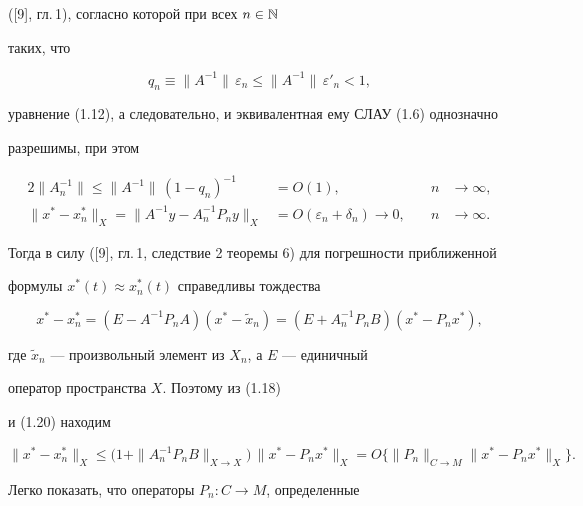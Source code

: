 ([9], гл.\,1), согласно которой при всех $n\in \Bbb N$


таких, что


\begin{equation}


q_n\equiv \|A^{-1}\|\, \varepsilon_n\leq \|A^{-1}\|\, \varepsilon'_n<1,


\end{equation}


уравнение (1.12), а следовательно, и эквивалентная ему СЛАУ (1.6) однозначно


разрешимы, при этом


\begin{alignat}{2}


\|A_n^{-1}\|\leq \|A^{-1}\|\, (1-q_n)^{-1}&=O(1),&\quad n&\to \infty ,\\


%


\|x^*-x_n^*\|_X=\|A^{-1}y-A_n^{-1}P_ny\|_X&=O(\varepsilon_n+\delta_n)


\rightarrow 0,&\quad n&\to \infty .


\end{alignat}


Тогда в силу ([9], гл.\,1, следствие 2 теоремы 6) для погрешности приближенной


формулы $x^*(t)\approx x_n^*(t)$ справедливы тождества


\begin{equation}


x^*-x_n^*=(E-A^{-1}P_nA)(x^*-\widetilde{x}_n)=(E+A_n^{-1}P_nB)(x^*-P_nx^*),


\end{equation}


где $\widetilde{x}_n$ --- произвольный элемент из $X_n$, а $E$ --- единичный


оператор пространства $X$. Поэтому из (1.18)


и (1.20) находим


\begin{equation}


\|x^*-x_n^*\|_X\leq \bigl(1+\|A_n^{-1}P_nB\|_{X\rightarrow X}\bigr)\,


\|x^*-P_nx^*\|_X=


O\bigl\{ \|P_n\|_{C\rightarrow M} \|x^*-P_nx^*\|_X\bigr\} .


\end{equation}


Легко показать, что операторы $P_n:C\rightarrow M$, определенные


